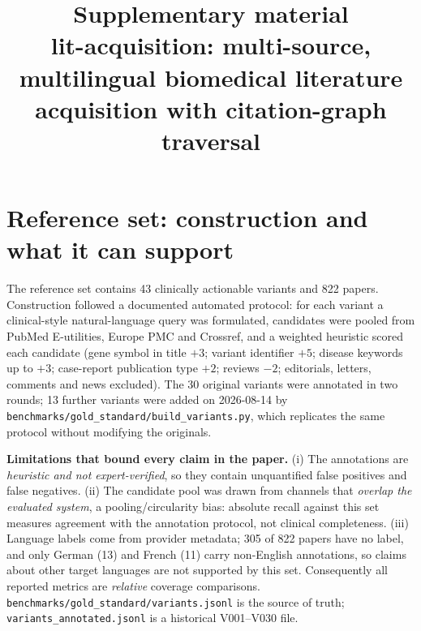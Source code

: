 \documentclass[11pt]{article}
\title{\bfseries Supplementary material\\[2pt]
\large lit-acquisition: multi-source, multilingual biomedical literature
acquisition with citation-graph traversal}
\author{}
\date{}
\newcommand{\code}[1]{\texttt{#1}}
\begin{document}
\maketitle
\vspace{-3em}

\section{Reference set: construction and what it can support}
The reference set contains 43 clinically actionable variants and 822 papers.
Construction followed a documented automated protocol: for each variant a
clinical-style natural-language query was formulated, candidates were pooled
from PubMed E-utilities, Europe PMC and Crossref, and a weighted heuristic
scored each candidate (gene symbol in title $+3$; variant identifier $+5$;
disease keywords up to $+3$; case-report publication type $+2$; reviews $-2$;
editorials, letters, comments and news excluded). The 30 original variants were
annotated in two rounds; 13 further variants were added on 2026-08-14 by
\code{benchmarks/gold\_standard/build\_variants.py}, which replicates the same
protocol without modifying the originals.

\textbf{Limitations that bound every claim in the paper.}
(i) The annotations are \emph{heuristic and not expert-verified}, so they
contain unquantified false positives and false negatives.
(ii) The candidate pool was drawn from channels that \emph{overlap the evaluated
system}, a pooling/circularity bias: absolute recall against this set measures
agreement with the annotation protocol, not clinical completeness.
(iii) Language labels come from provider metadata; 305 of 822 papers have no
label, and only German (13) and French (11) carry non-English annotations, so
claims about other target languages are not supported by this set.
Consequently all reported metrics are \emph{relative} coverage comparisons.
\code{benchmarks/gold\_standard/variants.jsonl} is the source of truth;
\code{variants\_annotated.jsonl} is a historical V001--V030 file.
\end{document}

